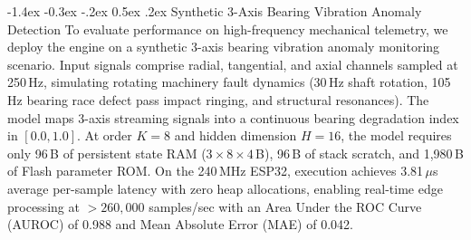 \documentclass[10pt,twocolumn,a4paper]{article}
\makeatletter
\renewcommand\subsection{\@startsection{subsection}{2}{\z@}%
  {-1.4ex \@plus -0.3ex \@minus -.2ex}%
  {0.5ex \@plus .2ex}%
  {\normalfont\normalsize\bfseries}}
\theoremstyle{plain}
\theoremstyle{definition}
\makeatother
\begin{document}
\subsection{Synthetic 3-Axis Bearing Vibration Anomaly Detection}
To evaluate performance on high-frequency mechanical telemetry, we deploy the engine on a synthetic 3-axis bearing vibration anomaly monitoring scenario. Input signals comprise radial, tangential, and axial channels sampled at 250\,Hz, simulating rotating machinery fault dynamics (30\,Hz shaft rotation, 105\,Hz bearing race defect pass impact ringing, and structural resonances). The model maps 3-axis streaming signals into a continuous bearing degradation index in $[0.0, 1.0]$. At order $K=8$ and hidden dimension $H=16$, the model requires only 96\,B of persistent state RAM ($3 \times 8 \times 4$\,B), 96\,B of stack scratch, and 1,980\,B of Flash parameter ROM. On the 240\,MHz ESP32, execution achieves 3.81\,$\mu$s average per-sample latency with zero heap allocations, enabling real-time edge processing at $>260{,}000$ samples/sec with an Area Under the ROC Curve (AUROC) of 0.988 and Mean Absolute Error (MAE) of 0.042.
\end{document}
